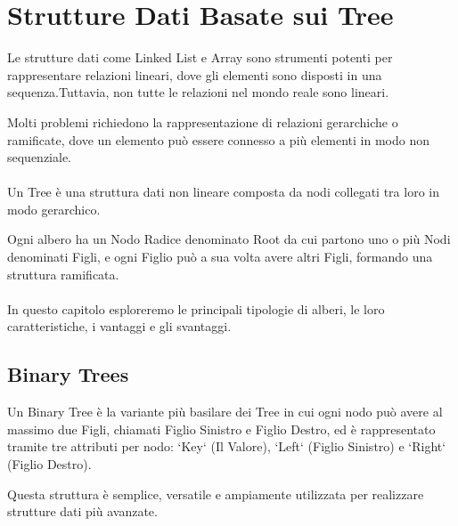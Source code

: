 \documentclass[12pt,a4paper,openright,twoside]{book}
\begin{document}
        \cite{cormen2022introduction}

    \section{Strutture Dati Basate sui Tree}

        Le strutture dati come Linked List e Array sono strumenti potenti per rappresentare relazioni lineari, dove gli elementi sono disposti in una sequenza.Tuttavia, non tutte le relazioni nel mondo reale sono lineari.

        Molti problemi richiedono la rappresentazione di relazioni gerarchiche o ramificate, dove un elemento può essere connesso a più elementi in modo non sequenziale.

        \paragraph*{}

        Un Tree è una struttura dati non lineare composta da nodi collegati tra loro in modo gerarchico.

        Ogni albero ha un Nodo Radice denominato Root da cui partono uno o più Nodi denominati Figli, e ogni Figlio può a sua volta avere altri Figli, formando una struttura ramificata.

        \paragraph*{}

        In questo capitolo esploreremo le principali tipologie di alberi, le loro caratteristiche, i vantaggi e gli svantaggi.

        \subsection{Binary Trees}

            Un Binary Tree è la variante più basilare dei Tree in cui ogni nodo può avere al massimo due Figli, chiamati Figlio Sinistro e Figlio Destro, ed è rappresentato tramite tre attributi per nodo: `Key` (Il Valore), `Left` (Figlio Sinistro) e `Right` (Figlio Destro).

            Questa struttura è semplice, versatile e ampiamente utilizzata per realizzare strutture dati più avanzate.

            \paragraph*{}
\end{document}
